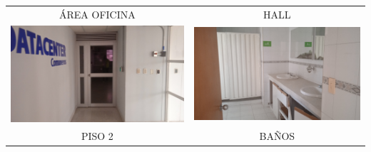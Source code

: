 \documentclass[12pt,a4paper,twoside]{article}
\begin{document}
\begin{tabular}{ c c }
	ÁREA OFICINA & HALL\\
	\includegraphics[width = 7 cm]{Imagenes/15} & \includegraphics[width = 7 cm]{Imagenes/16} \\
	PISO 2  &  BAÑOS\\

	
\end{tabular} 
\end{document}
